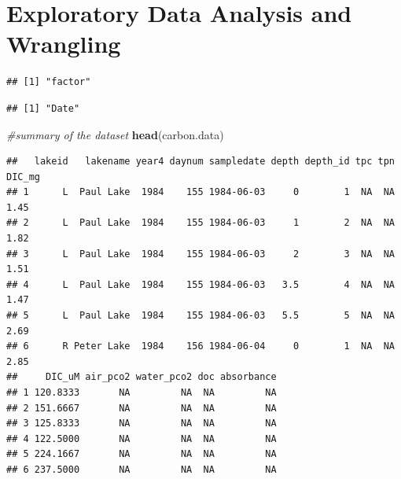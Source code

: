 \documentclass[12pt,]{article}
\newenvironment{Shaded}{\begin{snugshade}}{\end{snugshade}}
\newcommand{\KeywordTok}[1]{\textcolor[rgb]{0.13,0.29,0.53}{\textbf{#1}}}
\newcommand{\DataTypeTok}[1]{\textcolor[rgb]{0.13,0.29,0.53}{#1}}
\newcommand{\StringTok}[1]{\textcolor[rgb]{0.31,0.60,0.02}{#1}}
\newcommand{\CommentTok}[1]{\textcolor[rgb]{0.56,0.35,0.01}{\textit{#1}}}
\newcommand{\OperatorTok}[1]{\textcolor[rgb]{0.81,0.36,0.00}{\textbf{#1}}}
\newcommand{\NormalTok}[1]{#1}
\begin{document}
\newpage

\section{Exploratory Data Analysis and
Wrangling}\label{exploratory-data-analysis-and-wrangling}

\begin{Shaded}
\end{Shaded}

\begin{verbatim}
## [1] "factor"
\end{verbatim}

\begin{Shaded}
\end{Shaded}

\begin{verbatim}
## [1] "Date"
\end{verbatim}

\begin{Shaded}
\begin{Highlighting}[]
\CommentTok{#summary of the dataset}
\KeywordTok{head}\NormalTok{(carbon.data)}
\end{Highlighting}
\end{Shaded}

\begin{verbatim}
##   lakeid   lakename year4 daynum sampledate depth depth_id tpc tpn DIC_mg
## 1      L  Paul Lake  1984    155 1984-06-03     0        1  NA  NA   1.45
## 2      L  Paul Lake  1984    155 1984-06-03     1        2  NA  NA   1.82
## 3      L  Paul Lake  1984    155 1984-06-03     2        3  NA  NA   1.51
## 4      L  Paul Lake  1984    155 1984-06-03   3.5        4  NA  NA   1.47
## 5      L  Paul Lake  1984    155 1984-06-03   5.5        5  NA  NA   2.69
## 6      R Peter Lake  1984    156 1984-06-04     0        1  NA  NA   2.85
##     DIC_uM air_pco2 water_pco2 doc absorbance
## 1 120.8333       NA         NA  NA         NA
## 2 151.6667       NA         NA  NA         NA
## 3 125.8333       NA         NA  NA         NA
## 4 122.5000       NA         NA  NA         NA
## 5 224.1667       NA         NA  NA         NA
## 6 237.5000       NA         NA  NA         NA
\end{verbatim}
\end{document}
